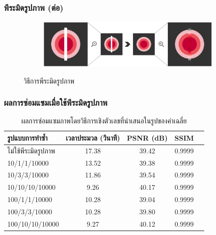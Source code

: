 \documentclass[xcolor=dvipsnames, xetex,serif]{beamer}
\numberwithin{equation}{section}
\begin{document}
		\begin{frame}
			\frametitle{พีระมิดรูปภาพ (ต่อ)}
			\begin{figure}[H]
				\centering
				\begin{subfigure}{0.8\linewidth}
					\centering
					\includegraphics[width=1\linewidth]{images/image_inpaint_synthetic/image_inital_solution.png}
				\end{subfigure}
				\caption{วิธีการพีระมิดรูปภาพ}
			\end{figure}
		\end{frame}
		\begin{frame}
			\frametitle{ผลการซ่อมแซมเมื่อใช้พีระมิดรูปภาพ}
			\begin{table}[H]
				\centering
				\begin{tabular}[ht]{|l|c|c|c|c|}
					\hline
					รูปแบบการทำซ้ำ  & เวลาประมวล  (วินาที) & PSNR (dB) & SSIM \\
					\hline
					ไม่ใช้พีระมิดรูปภาพ & 17.38 & 39.42 & 0.9999 \\
					10/1/1/10000 & 13.52 & 39.38 & 0.9999 \\
					10/3/3/10000 & 11.86 & 39.54 & 0.9999 \\
					10/10/10/10000 & 9.26 & 40.17 & 0.9999\\
					100/1/1/10000 & 10.28 & 39.04 & 0.9999\\
					100/3/3/10000 & 10.28 & 39.80 & 0.9999\\
					100/10/10/10000 & 9.27 & 40.12 & 0.9999 \\
					\hline
				\end{tabular}
				\caption{ผลการซ่อมแซมภาพโดยวิธีการเชิงตัวเลขที่นำเสนอในรูปของค่าเฉลี่ย}
				\label{result:table-multiresolution1-summary}
			\end{table}	
		\end{frame}
\end{document}
